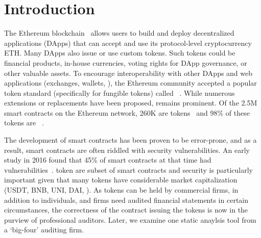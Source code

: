 
\section{Introduction}\label{sect:introduction}
The Ethereum blockchain~\cite{EthGit,EIP150} allows users to build and deploy decentralized applications (DApps) that can accept and use its protocol-level cryptocurrency ETH. Many DApps also issue or use custom tokens. Such tokens could be financial products, in-house currencies, voting rights for DApp governance, or other valuable assets. To encourage interoperability with other DApps and web applications (exchanges, wallets, \etc), the Ethereum community accepted a popular token standard (specifically for fungible tokens) called \erc~\cite{ERC20Std}. While numerous \erc extensions or replacements have been proposed, \erc remains prominent. Of the 2.5M~\cite{Alethio} smart contracts on the Ethereum network, 260K are tokens~\cite{TokenTracker} and 98\% of these tokens are \erc~\cite{EtherScan}. 

The development of smart contracts has been proven to be error-prone, and as a result, smart contracts are often riddled with security vulnerabilities. An early study in 2016 found that 45\% of smart contracts at that time had vulnerabilities~\cite{MakSm}. \erc token are subset of smart contracts and security is particularly important given that many tokens have considerable market capitalization (\eg USDT, BNB, UNI, DAI, \etc). As tokens can be held by commercial firms, in addition to individuals, and firms need audited financial statements in certain circumstances, the correctness of the contract issuing the tokens is now in the purview of professional auditors. Later, we examine one static anaylsis tool from a `big-four' auditing firm.

